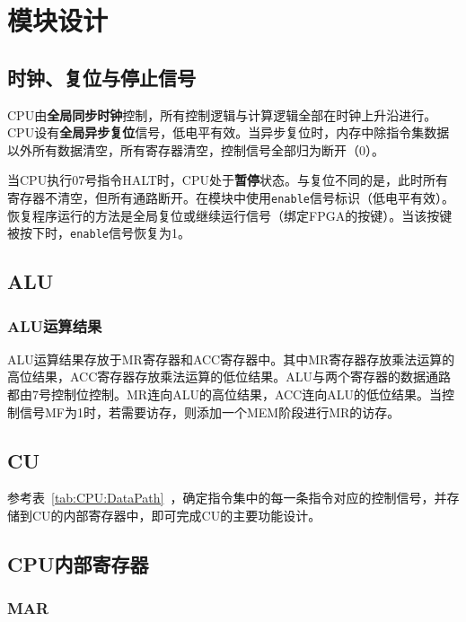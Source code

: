 \documentclass[lang=cn,a4paper,newtx]{elegantpaper}
\begin{document}

\section{模块设计}
\subsection{时钟、复位与停止信号}
CPU由\textbf{全局同步时钟}控制，所有控制逻辑与计算逻辑全部在时钟上升沿进行。CPU设有\textbf{全局异步复位}信号，低电平有效。当异步复位时，内存中除指令集数据以外所有数据清空，所有寄存器清空，控制信号全部归为断开（0）。

当CPU执行07号指令HALT时，CPU处于\textbf{暂停}状态。与复位不同的是，此时所有寄存器不清空，但所有通路断开。在模块中使用\texttt{enable}信号标识（低电平有效）。恢复程序运行的方法是全局复位或继续运行信号（绑定FPGA的按键）。当该按键被按下时，\texttt{enable}信号恢复为1。
\subsection{ALU}
\subsubsection{ALU运算结果}
ALU运算结果存放于MR寄存器和ACC寄存器中。其中MR寄存器存放乘法运算的高位结果，ACC寄存器存放乘法运算的低位结果。ALU与两个寄存器的数据通路都由7号控制位控制。MR连向ALU的高位结果，ACC连向ALU的低位结果。当控制信号MF为1时，若需要访存，则添加一个MEM阶段进行MR的访存。

\subsection{CU}
参考表~\ref{tab:CPU:DataPath}~，确定指令集中的每一条指令对应的控制信号，并存储到CU的内部寄存器中，即可完成CU的主要功能设计。


\subsection{CPU内部寄存器}
\subsubsection{MAR}
\end{document}
